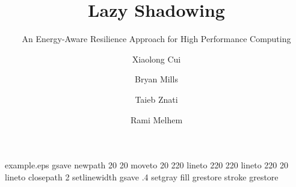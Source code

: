 %
%
%
%
%
\begin{filecontents*}{example.eps}
gsave
newpath
  20 20 moveto
  20 220 lineto
  220 220 lineto
  220 20 lineto
closepath
2 setlinewidth
gsave
  .4 setgray fill
grestore
stroke
grestore
\end{filecontents*}
%
\RequirePackage{fix-cm}
%
\documentclass[twocolumn]{svjour3}          %
%
\smartqed  %
%
\usepackage{graphicx}
\usepackage{amsmath}
\usepackage{subfigure}
%
%
%
%
%


\title{Lazy Shadowing%
}
\subtitle{An Energy-Aware Resilience Approach for High Performance Computing}


\author{Xiaolong Cui         \and
        Bryan Mills          \and
        Taieb Znati          \and
        Rami Melhem
}


